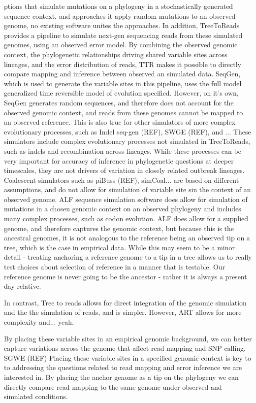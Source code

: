 ptions that simulate mutations on a phylogeny in a stochastically generated sequence context,
and approaches it apply random mutations to an observed genome, no existing software unites the approaches.
In addition, TreeToReads provides a pipeline to simulate next-gen sequencing reads from these simulated genomes, using an observed error model.
By combining the observed genomic context, the phylogenetic relationships driving shared variable sites across lineages,
and the error distribution of reads, TTR makes it possible to directly compare mapping and inference between observed an simulated data.
SeqGen, which is used to generate the variable sites in this pipeline, uses the full model generalized time reversible model of evolution specified.
However, on it's own, SeqGen generates random sequences, and therefore does not account for the observed genomic context,
and reads from these genomes cannot be mapped to an observed reference. %
This is also true for other simulators of more complex evolutionary processes, such as Indel seq-gen (REF), SWGE (REF),  and ...
These simulators include complex evolutionary processes not simulated in TreeToReads, such as indels and recombination across lineages.
While these processes can be very important for accuracy of inference in phylogenetic questions at deeper timescales,
they are not drivers of variation in closely related outbreak lineages.
Coalescent simulators such as piBuss (REF), simCoal... are based on different assumptions, and do not allow for simulation of variable site sin the context of an observed genome.
ALF sequence simulation software does allow for simulation of mutations in a chosen genomic context on an observed phylogeny and includes many complex processes, 
such as codon evolution.
ALF does allow for a supplied genome, and therefore captures the genomic context, but because this is the ancestral genomes, it is not analogous to the reference being an observed tip on a tree, 
which is the case in empirical data.
While this may seem to be a minor detail - treating anchoring a reference genome to a tip in a tree allows us to really test choices about selection of reference in a manner that is testable.
Our reference genome is never going to be the ancestor - rather it is always a present day relative.


In contrast, Tree to reads allows for direct integration of the genomic simulation and the the simulation of reads, and is simpler.
However, ART allows for more complexity and... yeah.

By placing these variable sites in an empirical genomic background, we can better capture variations across the genome that affect read mapping and SNP calling.
SGWE (REF)
Placing these variable sites in a specified genomic context is key to to addressing the questions related to read mapping and error inference
we are interested in.
By placing the anchor genome as a tip on the phylogeny we can directly compare read mapping to the same genome under observed and simulated conditions.


